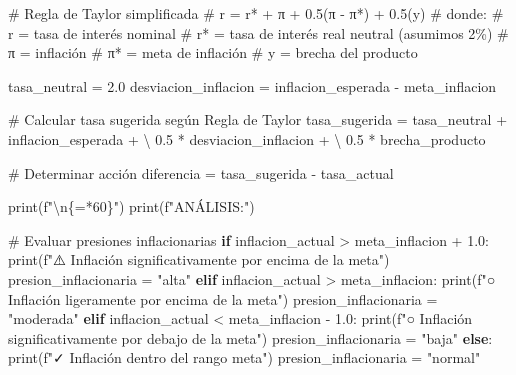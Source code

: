 \documentclass[
  doc,
  floatsintext,
  longtable,
  a4paper,
  nolmodern,
  notxfonts,
  notimes,
  12pt,
  colorlinks=true,linkcolor=blue,citecolor=blue,urlcolor=blue]{apa7}
\newenvironment{Shaded}{\begin{snugshade}}{\end{snugshade}}
\newcommand{\BuiltInTok}[1]{\textcolor[rgb]{0.00,0.23,0.31}{#1}}
\newcommand{\CharTok}[1]{\textcolor[rgb]{0.13,0.47,0.30}{#1}}
\newcommand{\CommentTok}[1]{\textcolor[rgb]{0.37,0.37,0.37}{#1}}
\newcommand{\ControlFlowTok}[1]{\textcolor[rgb]{0.00,0.23,0.31}{\textbf{#1}}}
\newcommand{\DecValTok}[1]{\textcolor[rgb]{0.68,0.00,0.00}{#1}}
\newcommand{\FloatTok}[1]{\textcolor[rgb]{0.68,0.00,0.00}{#1}}
\newcommand{\NormalTok}[1]{\textcolor[rgb]{0.00,0.23,0.31}{#1}}
\newcommand{\OperatorTok}[1]{\textcolor[rgb]{0.37,0.37,0.37}{#1}}
\newcommand{\SpecialCharTok}[1]{\textcolor[rgb]{0.37,0.37,0.37}{#1}}
\newcommand{\SpecialStringTok}[1]{\textcolor[rgb]{0.13,0.47,0.30}{#1}}
\newcommand{\StringTok}[1]{\textcolor[rgb]{0.13,0.47,0.30}{#1}}
\begin{document}
\begin{Shaded}
\begin{Highlighting}[]
        \CommentTok{\# Regla de Taylor simplificada}
        \CommentTok{\# r = r* + π + 0.5(π {-} π*) + 0.5(y)}
        \CommentTok{\# donde:}
        \CommentTok{\# r = tasa de interés nominal}
        \CommentTok{\# r* = tasa de interés real neutral (asumimos 2\%)}
        \CommentTok{\# π = inflación}
        \CommentTok{\# π* = meta de inflación}
        \CommentTok{\# y = brecha del producto}
        
\NormalTok{        tasa\_neutral }\OperatorTok{=} \FloatTok{2.0}
\NormalTok{        desviacion\_inflacion }\OperatorTok{=}\NormalTok{ inflacion\_esperada }\OperatorTok{{-}}\NormalTok{ meta\_inflacion}
        
        \CommentTok{\# Calcular tasa sugerida según Regla de Taylor}
\NormalTok{        tasa\_sugerida }\OperatorTok{=}\NormalTok{ tasa\_neutral }\OperatorTok{+}\NormalTok{ inflacion\_esperada }\OperatorTok{+} \OperatorTok{\textbackslash{}}
                       \FloatTok{0.5} \OperatorTok{*}\NormalTok{ desviacion\_inflacion }\OperatorTok{+} \OperatorTok{\textbackslash{}}
                       \FloatTok{0.5} \OperatorTok{*}\NormalTok{ brecha\_producto}
        
        \CommentTok{\# Determinar acción}
\NormalTok{        diferencia }\OperatorTok{=}\NormalTok{ tasa\_sugerida }\OperatorTok{{-}}\NormalTok{ tasa\_actual}
        
        \BuiltInTok{print}\NormalTok{(}\SpecialStringTok{f"}\CharTok{\textbackslash{}n}\SpecialCharTok{\{}\StringTok{\textquotesingle{}=\textquotesingle{}}\OperatorTok{*}\DecValTok{60}\SpecialCharTok{\}}\SpecialStringTok{"}\NormalTok{)}
        \BuiltInTok{print}\NormalTok{(}\SpecialStringTok{f"ANÁLISIS:"}\NormalTok{)}
        
        \CommentTok{\# Evaluar presiones inflacionarias}
        \ControlFlowTok{if}\NormalTok{ inflacion\_actual }\OperatorTok{\textgreater{}}\NormalTok{ meta\_inflacion }\OperatorTok{+} \FloatTok{1.0}\NormalTok{:}
            \BuiltInTok{print}\NormalTok{(}\SpecialStringTok{f"⚠️  Inflación significativamente por encima de la meta"}\NormalTok{)}
\NormalTok{            presion\_inflacionaria }\OperatorTok{=} \StringTok{"alta"}
        \ControlFlowTok{elif}\NormalTok{ inflacion\_actual }\OperatorTok{\textgreater{}}\NormalTok{ meta\_inflacion:}
            \BuiltInTok{print}\NormalTok{(}\SpecialStringTok{f"○ Inflación ligeramente por encima de la meta"}\NormalTok{)}
\NormalTok{            presion\_inflacionaria }\OperatorTok{=} \StringTok{"moderada"}
        \ControlFlowTok{elif}\NormalTok{ inflacion\_actual }\OperatorTok{\textless{}}\NormalTok{ meta\_inflacion }\OperatorTok{{-}} \FloatTok{1.0}\NormalTok{:}
            \BuiltInTok{print}\NormalTok{(}\SpecialStringTok{f"○ Inflación significativamente por debajo de la meta"}\NormalTok{)}
\NormalTok{            presion\_inflacionaria }\OperatorTok{=} \StringTok{"baja"}
        \ControlFlowTok{else}\NormalTok{:}
            \BuiltInTok{print}\NormalTok{(}\SpecialStringTok{f"✓ Inflación dentro del rango meta"}\NormalTok{)}
\NormalTok{            presion\_inflacionaria }\OperatorTok{=} \StringTok{"normal"}
        

\end{Highlighting}
\end{Shaded}
\end{document}

